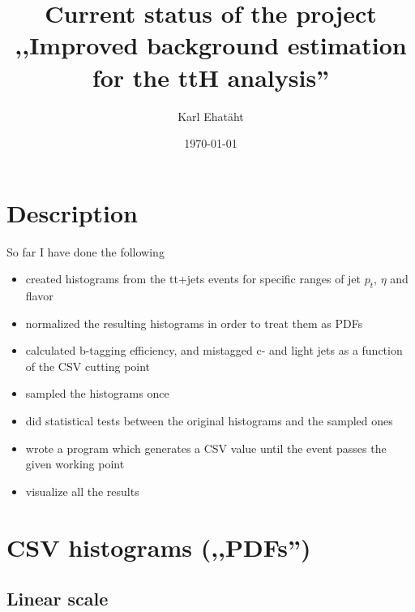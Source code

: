 \documentclass[12pt,a4paper]{article}
\title{\TitleFont\textbf{Current status of the project\\
,,Improved background estimation for the ttH analysis''}}
\author{Karl Ehatäht}
\date\today
\begin{document}
\maketitle

\section{Description}

So far I have done the following
\begin{itemize}
\item created histograms from the tt+jets events for specific ranges of jet $p_t$, $\eta$ and flavor
\item normalized the resulting histograms in order to treat them as PDFs
\item calculated b-tagging efficiency, and mistagged c- and light jets as a function of the CSV cutting point
\item sampled the histograms once
\item did statistical tests between the original histograms and the sampled ones
\item wrote a program which generates a CSV value until the event passes the given working point
\item visualize all the results
\end{itemize}

\section{CSV histograms (,,PDFs'')}
\subsection{Linear scale}
\begin{figure}[H]



\end{figure}
\end{document}

